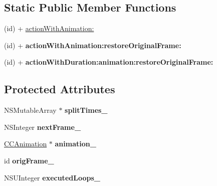 \subsection*{Static Public Member Functions}
\begin{DoxyCompactItemize}
\item 
(id) + \hyperlink{interface_c_c_animate_a509b8a655b24ee34615bbe2eb65f8db0}{action\-With\-Animation\-:}
\item 
\hypertarget{interface_c_c_animate_aad0e7d923d64f361cfb9e7789ce5d247}{(id) + {\bfseries action\-With\-Animation\-:restore\-Original\-Frame\-:}}\label{interface_c_c_animate_aad0e7d923d64f361cfb9e7789ce5d247}

\item 
\hypertarget{interface_c_c_animate_a558bf0ba5d04a167e7678c4e992cb9e6}{(id) + {\bfseries action\-With\-Duration\-:animation\-:restore\-Original\-Frame\-:}}\label{interface_c_c_animate_a558bf0ba5d04a167e7678c4e992cb9e6}

\end{DoxyCompactItemize}
\subsection*{Protected Attributes}
\begin{DoxyCompactItemize}
\item 
\hypertarget{interface_c_c_animate_a3e9776b0c46dfe112a5685f46568a7ba}{N\-S\-Mutable\-Array $\ast$ {\bfseries split\-Times\-\_\-}}\label{interface_c_c_animate_a3e9776b0c46dfe112a5685f46568a7ba}

\item 
\hypertarget{interface_c_c_animate_a78c3c9a779b381be83417c3e249829ba}{N\-S\-Integer {\bfseries next\-Frame\-\_\-}}\label{interface_c_c_animate_a78c3c9a779b381be83417c3e249829ba}

\item 
\hypertarget{interface_c_c_animate_a69f62bb2f660f09fa9bc82e1917252f4}{\hyperlink{interface_c_c_animation}{C\-C\-Animation} $\ast$ {\bfseries animation\-\_\-}}\label{interface_c_c_animate_a69f62bb2f660f09fa9bc82e1917252f4}

\item 
\hypertarget{interface_c_c_animate_aa1c3752a4414fb3db1e4b1cc75609c4a}{id {\bfseries orig\-Frame\-\_\-}}\label{interface_c_c_animate_aa1c3752a4414fb3db1e4b1cc75609c4a}

\item 
\hypertarget{interface_c_c_animate_a3af44f2473639fbc9213aa349bba9155}{N\-S\-U\-Integer {\bfseries executed\-Loops\-\_\-}}\label{interface_c_c_animate_a3af44f2473639fbc9213aa349bba9155}

\end{DoxyCompactItemize}
